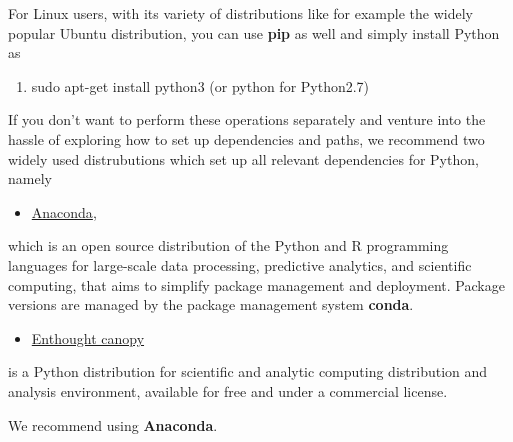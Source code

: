 \documentclass[%
oneside,                 %
final,                   %
10pt]{article}
\newenvironment{doconceexercise}{}{}
\begin{document}
\begin{doconceexercise}
\noindent
For Linux users, with its variety of distributions like for example the widely popular Ubuntu distribution,
you can use \textbf{pip} as well and simply install Python as 

\begin{enumerate}
\item sudo apt-get install python3  (or python for Python2.7)
\end{enumerate}

\noindent
If you don't want to perform these operations separately and venture
into the hassle of exploring how to set up dependencies and paths, we
recommend two widely used distrubutions which set up all relevant
dependencies for Python, namely 

\begin{itemize}
\item \href{{https://docs.anaconda.com/}}{Anaconda}, 
\end{itemize}

\noindent
which is an open source
distribution of the Python and R programming languages for large-scale
data processing, predictive analytics, and scientific computing, that
aims to simplify package management and deployment. Package versions
are managed by the package management system \textbf{conda}. 

\begin{itemize}
\item \href{{https://www.enthought.com/product/canopy/}}{Enthought canopy} 
\end{itemize}

\noindent
is a Python
distribution for scientific and analytic computing distribution and
analysis environment, available for free and under a commercial
license.

We recommend using \textbf{Anaconda}.

\end{doconceexercise}
\end{document}
